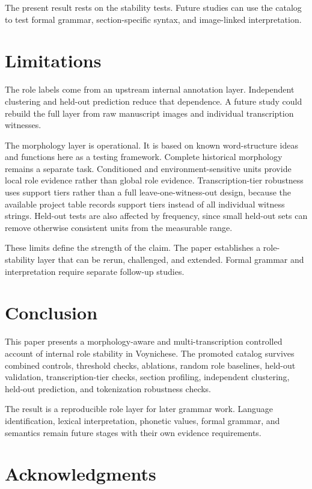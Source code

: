 \documentclass[11pt]{article}
\begin{document}
The present result rests on the stability tests. Future studies can use the catalog to test formal grammar, section-specific syntax, and image-linked interpretation.

\section{Limitations}

The role labels come from an upstream internal annotation layer. Independent clustering and held-out prediction reduce that dependence. A future study could rebuild the full layer from raw manuscript images and individual transcription witnesses.

The morphology layer is operational. It is based on known word-structure ideas and functions here as a testing framework. Complete historical morphology remains a separate task. Conditioned and environment-sensitive units provide local role evidence rather than global role evidence. Transcription-tier robustness uses support tiers rather than a full leave-one-witness-out design, because the available project table records support tiers instead of all individual witness strings. Held-out tests are also affected by frequency, since small held-out sets can remove otherwise consistent units from the measurable range.

These limits define the strength of the claim. The paper establishes a role-stability layer that can be rerun, challenged, and extended. Formal grammar and interpretation require separate follow-up studies.

\section{Conclusion}

This paper presents a morphology-aware and multi-transcription controlled account of internal role stability in Voynichese. The promoted catalog survives combined controls, threshold checks, ablations, random role baselines, held-out validation, transcription-tier checks, section profiling, independent clustering, held-out prediction, and tokenization robustness checks.

The result is a reproducible role layer for later grammar work. Language identification, lexical interpretation, phonetic values, formal grammar, and semantics remain future stages with their own evidence requirements.

\section*{Acknowledgments}
\end{document}
